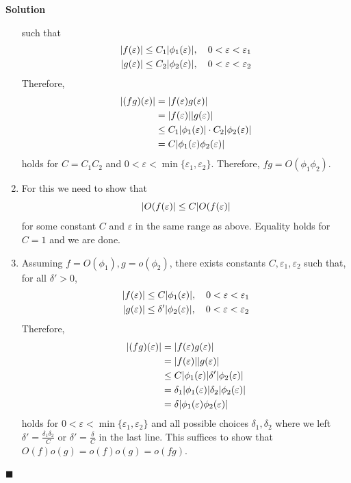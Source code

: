 \documentclass[11pt]{article}
\newcommand{\vep}{\varepsilon}
\DeclarePairedDelimiter\abs{\lvert}{\rvert}
\theoremstyle{problemstyle}
\newenvironment{solution}
  {\noindent\textbf{Solution}\quad}
  {\hfill$\blacksquare$\par\vspace{1em}}
\begin{document}
\begin{solution}
\begin{enumerate}
      such that
      \begin{align*}
        \abs{f(\vep)} & \leq C_1 \abs{\phi_1(\vep)}, \quad 0 < \vep < \vep_1 \\
        \abs{g(\vep)} & \leq C_2 \abs{\phi_2(\vep)}, \quad 0 < \vep < \vep_2
      \end{align*}
      Therefore,
      \begin{align*}
        \abs{(fg)(\vep)} 
          & = \abs{f(\vep)g(\vep)} \\
          & = \abs{f(\vep)}\abs{g(\vep)} \\
          & \leq C_1 \abs{\phi_1(\vep)} \cdot C_2 \abs{\phi_2(\vep)} \\
          & = C \abs{\phi_1(\vep)\phi_2(\vep)} \\
      \end{align*}
      holds for $C = C_1 C_2$ and $0 < \vep < \min\{\vep_1, \vep_2\}$.
      Therefore, $fg = O(\phi_1\phi_2)$.
    \item For this we need to show that
      \[\abs{O(f(\vep)} \leq C \abs{O(f(\vep)} \]
      for some constant $C$ and $\vep$ in the same range as above. Equality holds for $C = 1$ and
      we are done.
    \item Assuming $f = O(\phi_1), g = o(\phi_2)$, there exists constants $C,\vep_1,\vep_2$
      such that, for all $\delta' > 0$,
      \begin{align*}
        \abs{f(\vep)} & \leq C \abs{\phi_1(\vep)}, \quad 0 < \vep < \vep_1 \\
        \abs{g(\vep)} & \leq \delta' \abs{\phi_2(\vep)}, \quad 0 < \vep < \vep_2
      \end{align*}
      Therefore,
      \begin{align*}
        \abs{(fg)(\vep)} 
          & = \abs{f(\vep)g(\vep)} \\
          & = \abs{f(\vep)}\abs{g(\vep)} \\
          & \leq C \abs{\phi_1(\vep)} \delta' \abs{\phi_2(\vep)} \\
          & = \delta_1 \abs{\phi_1(\vep)} \delta_2 \abs{\phi_2(\vep)} \\
          & = \delta \abs{\phi_1(\vep)\phi_2(\vep)}
      \end{align*}
      holds for $0 < \vep < \min\{\vep_1, \vep_2\}$ and all possible choices $\delta_1, \delta_2$
      where we left $\delta' = \frac{\delta_1 \delta_2}{C}$ or $\delta' = \frac{\delta}{C}$ in the
      last line. This suffices to show that $O(f)o(g) = o(f)o(g) = o(fg)$.

  \end{enumerate} 
\end{solution}
 
\end{document}

